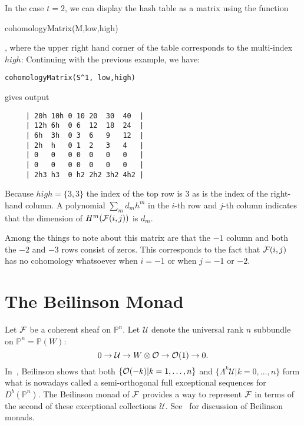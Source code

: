 \documentclass[twoside,12pt, leqno]{amsart}
\def\PP{{\mathbb P}}
\def\CU{{\mathcal U}}
\begin{document}
In the case $t=2$, we can display the hash table as a matrix using the function
\begin{verb}
 cohomologyMatrix(M,low,high)
\end{verb},
where the upper right hand corner of the table corresponds to the multi-index $high$: Continuing with the previous example,
we have:
{\small \begin{verbatim}
cohomologyMatrix(S^1, low,high)
\end{verbatim}}
\noindent gives output
{\small 
\begin{verbatim}
     | 20h 10h 0 10 20  30  40  |
     | 12h 6h  0 6  12  18  24  |
     | 6h  3h  0 3  6   9   12  |
     | 2h  h   0 1  2   3   4   |
     | 0   0   0 0  0   0   0   |
     | 0   0   0 0  0   0   0   |
     | 2h3 h3  0 h2 2h2 3h2 4h2 |
\end{verbatim}}
Because $high = \{3,3\}$ the index of the top row is 3 as is the index of the right-hand column. A polynomial $\sum_m d_mh^m$ in the $i$-th row and $j$-th column indicates that the dimension
of $H^m({\mathcal F}(i,j))$ is $d_m$. 

Among the things to note about this matrix are that the $-1$ column and both the $-2$ and $-3$ rows consist of  zeros. This corresponds to the fact that ${\mathcal F}(i,j)$ has no cohomology whatsoever when $i=-1$ or when $j=-1$ or $-2$.

    
\section{The Beilinson Monad}\label{sec:beilinson monad}
Let ${\mathcal F}$ be a coherent sheaf on $\PP^n$. 
Let $\CU$ denote the universal rank $n$ subbundle on $\PP^n=\PP(W)$:
$$ 0 \to \CU \to W\otimes \sO \to \sO(1) \to 0.$$ 
In~\cite{beilinson}, Beilinson shows that both $\{ {\mathcal O}(-k) | k=1,\ldots,n\}$ and 
$\{ \Lambda^k \CU | k=0, \ldots, n\}$ form what is nowadays called a semi-orthogonal full exceptional  sequences for $D^b(\PP^n)$.
The Beilinson monad of ${\mathcal F}$ provides a way to represent ${\mathcal F}$ in terms of the second of these exceptional collections $\CU$.  See~\cite{beilinson,AO,EFS,Huy} for discussion of Beilinson monads.
\end{document}
